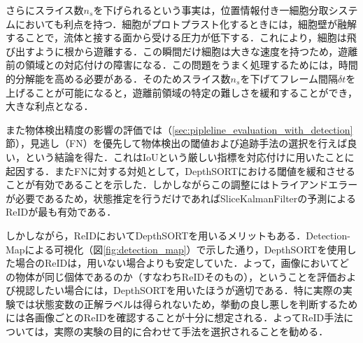     さらにスライス数$n_s$を下げられるという事実は，位置情報付き一細胞分取システムにおいても利点を持つ．細胞がプロトプラスト化するときには，細胞壁が融解することで，流体と接する面から受ける圧力が低下する．これにより，細胞は飛び出すように根から遊離する．この瞬間だけ細胞は大きな速度を持つため，遊離前の領域との対応付けの障害になる．この問題をうまく処理するためには，時間的分解能を高める必要がある．そのためスライス数$n_s$を下げてフレーム間隔$\delta t$を上げることが可能になると，遊離前領域の特定の難しさを緩和することができ，大きな利点となる．

    また物体検出精度の影響の評価では（\ref{sec:pipleline_evaluation_with_detection}節），見逃し（FN）を優先して物体検出の閾値および追跡手法の選択を行えば良い，という結論を得た．これはIoUという厳しい指標を対応付けに用いたことに起因する．またFNに対する対処として，DepthSORTにおける閾値を緩和させることが有効であることを示した．しかしながらこの調整にはトライアンドエラーが必要であるため，状態推定を行うだけであればSliceKalmanFilterの予測によるReIDが最も有効である．

    しかしながら，ReIDにおいてDepthSORTを用いるメリットもある．Detection-Mapによる可視化（図\ref{fig:detection_map}）で示した通り，DepthSORTを使用した場合のReIDは，用いない場合よりも安定していた．よって，画像においてどの物体が同じ個体であるのか（すなわちReIDそのもの），ということを評価および視認したい場合には，DepthSORTを用いたほうが適切である．特に実際の実験では状態変数の正解ラベルは得られないため，挙動の良し悪しを判断するためには各画像ごとのReIDを確認することが十分に想定される．よってReID手法については，実際の実験の目的に合わせて手法を選択されることを勧める．